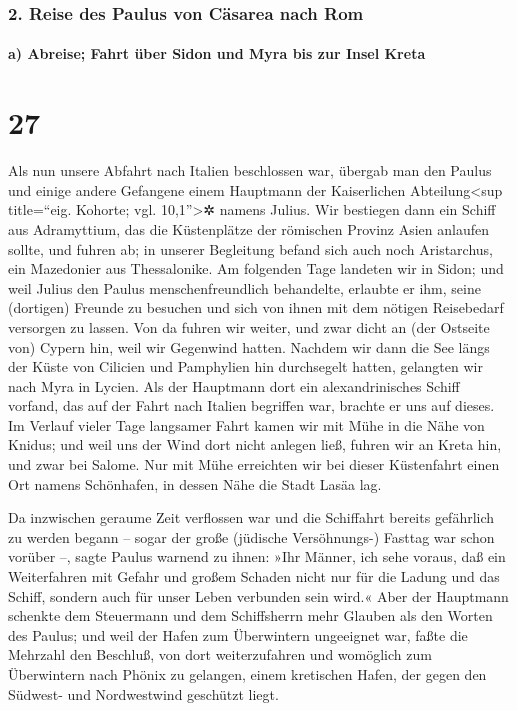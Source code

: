 \hypertarget{reise-des-paulus-von-cuxe4sarea-nach-rom}{%
\subsubsection{2. Reise des Paulus von Cäsarea nach
Rom}\label{reise-des-paulus-von-cuxe4sarea-nach-rom}}

\hypertarget{a-abreise-fahrt-uxfcber-sidon-und-myra-bis-zur-insel-kreta}{%
\paragraph{a) Abreise; Fahrt über Sidon und Myra bis zur Insel
Kreta}\label{a-abreise-fahrt-uxfcber-sidon-und-myra-bis-zur-insel-kreta}}

\hypertarget{section-26}{%
\section{27}\label{section-26}}

 Als nun unsere Abfahrt nach Italien beschlossen war,
übergab man den Paulus und einige andere Gefangene einem Hauptmann der
Kaiserlichen Abteilung\textless sup title=``eig. Kohorte; vgl.
10,1''\textgreater✲ namens Julius.  Wir bestiegen dann ein
Schiff aus Adramyttium, das die Küstenplätze der römischen Provinz Asien
anlaufen sollte, und fuhren ab; in unserer Begleitung befand sich auch
noch Aristarchus, ein Mazedonier aus Thessalonike.  Am
folgenden Tage landeten wir in Sidon; und weil Julius den Paulus
menschenfreundlich behandelte, erlaubte er ihm, seine (dortigen) Freunde
zu besuchen und sich von ihnen mit dem nötigen Reisebedarf versorgen zu
lassen.  Von da fuhren wir weiter, und zwar dicht an (der
Ostseite von) Cypern hin, weil wir Gegenwind hatten. 
Nachdem wir dann die See längs der Küste von Cilicien und Pamphylien hin
durchsegelt hatten, gelangten wir nach Myra in Lycien. 
Als der Hauptmann dort ein alexandrinisches Schiff vorfand, das auf der
Fahrt nach Italien begriffen war, brachte er uns auf dieses.
 Im Verlauf vieler Tage langsamer Fahrt kamen wir mit Mühe
in die Nähe von Knidus; und weil uns der Wind dort nicht anlegen ließ,
fuhren wir an Kreta hin, und zwar bei Salome.  Nur mit
Mühe erreichten wir bei dieser Küstenfahrt einen Ort namens Schönhafen,
in dessen Nähe die Stadt Lasäa lag.

 Da inzwischen geraume Zeit verflossen war und die
Schiffahrt bereits gefährlich zu werden begann -- sogar der große
(jüdische Versöhnungs-) Fasttag war schon vorüber --, sagte Paulus
warnend zu ihnen:  »Ihr Männer, ich sehe voraus, daß ein
Weiterfahren mit Gefahr und großem Schaden nicht nur für die Ladung und
das Schiff, sondern auch für unser Leben verbunden sein wird.«
 Aber der Hauptmann schenkte dem Steuermann und dem
Schiffsherrn mehr Glauben als den Worten des Paulus;  und
weil der Hafen zum Überwintern ungeeignet war, faßte die Mehrzahl den
Beschluß, von dort weiterzufahren und womöglich zum Überwintern nach
Phönix zu gelangen, einem kretischen Hafen, der gegen den Südwest- und
Nordwestwind geschützt liegt.

